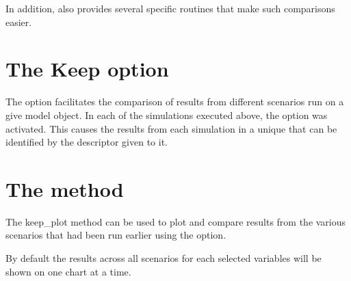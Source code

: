 \documentclass[letterpaper,10pt,english]{jupyterBook}
\begin{document}
\sphinxAtStartPar
In addition,  also provides several specific routines that make such comparisons easier.


\section{The Keep option}
\label{\detokenize{content/06_WBModels/ScenarioAnalysis:the-keep-option}}
\sphinxAtStartPar
The  option facilitates the comparison of results from different scenarios run on a give model object.  In each of the simulations executed above, the  option was activated. This causes the results from each simulation in a unique  that can be identified by the descriptor given to it.


\section{The  method}
\label{\detokenize{content/06_WBModels/ScenarioAnalysis:the-keep-plot-method}}
\sphinxAtStartPar
The keep\_plot method can be used to plot and compare results from the various scenarios that had been run earlier using the  option.

\sphinxAtStartPar
By default the results across all scenarios for each selected variables will be shown on one chart at a time.
\end{document}
